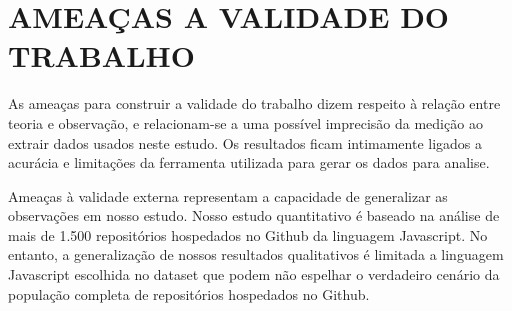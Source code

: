 
\chapter{AMEAÇAS A VALIDADE DO TRABALHO}
\label{chap:AmeacasAValidade}

As ameaças para construir a validade do trabalho dizem respeito à relação entre teoria e observação, e relacionam-se a uma possível imprecisão da medição ao extrair dados usados neste estudo. Os resultados ficam intimamente ligados a acurácia e limitações da ferramenta utilizada para gerar os dados para analise.

Ameaças à validade externa representam a capacidade de generalizar as observações em nosso estudo. Nosso estudo quantitativo é baseado na análise de mais de 1.500 repositórios hospedados no Github da linguagem Javascript.  No entanto, a generalização de nossos resultados qualitativos é limitada a linguagem Javascript escolhida no dataset que podem não espelhar o verdadeiro cenário da população completa de repositórios hospedados no Github.


